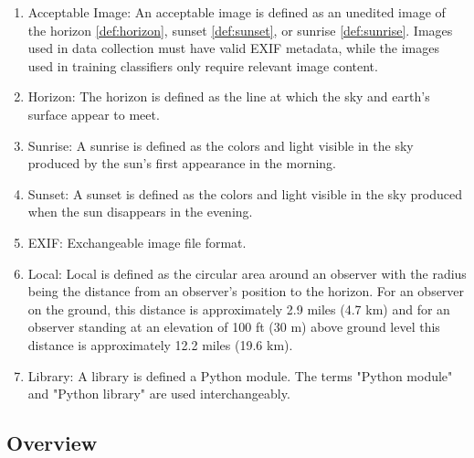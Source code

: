 \documentclass[journal,10pt,draftclsnofoot,onecolumn]{IEEEtran}
\begin{document}
\begin{singlespace}
\begin{enumerate}
			\item \label{def:accImg} Acceptable Image: An acceptable image is defined as an unedited image of the horizon \ref{def:horizon}, sunset \ref{def:sunset}, or sunrise \ref{def:sunrise}.
			Images used in data collection must have valid EXIF metadata, while the images used in training classifiers only require relevant image content.\\

			\item \label{def:horizon} Horizon: The horizon is defined as the line at which the sky and earth's surface appear to meet.\\

			\item \label{def:sunrise} Sunrise: A sunrise is defined as the colors and light visible in the sky produced by the sun's first appearance in the morning.\\

			\item \label{def:sunset} Sunset: A sunset is defined as the colors and light visible in the sky produced when the sun disappears in the evening.\\

			\item \label{def:exif} EXIF: Exchangeable image file format. \\

			\item \label{def:local} Local: Local is defined as the circular area around an observer with the radius being the distance from an observer's position to the horizon. For an observer on the ground, this distance is approximately 2.9 miles (4.7 km) and for an observer standing at an elevation of 100 ft (30 m) above ground level this distance is approximately 12.2 miles (19.6 km). \\

			\item \label{def:lib} Library: A library is defined a Python module. The terms "Python module" and "Python library" are used interchangeably.
		\end{enumerate}

	\nocite{*}
	
	

	\subsection{Overview}

\clearpage


\end{singlespace}
\end{document}
